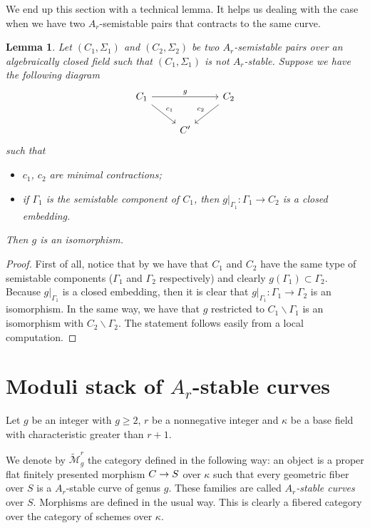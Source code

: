 \documentclass{alggeom}
\numberwithin{equation}{section}
\numberwithin{subsection}{section}
\newtheorem{lemma}[theorem]{Lemma}
\theoremstyle{definition}
\theoremstyle{remark}
\newcommand\arr{\ifinner\to\else\longrightarrow\fi}
\renewcommand{\setminus}{\smallsetminus}
\newcommand{\Mtilde}{\widetilde{\mathcal M}}
\begin{document}
We end up this section with a technical lemma. It helps us dealing with the case when we have two $A_r$-semistable pairs that contracts to the same curve.

\begin{lemma}\label{lem:contrac-unique}
 Let $(C_1,\Sigma_1)$ and $(C_2,\Sigma_2)$ be two $A_r$-semistable pairs over an algebraically closed field such that $(C_1,\Sigma_1)$ is not $A_r$-stable. Suppose we have the following diagram
 $$
 \begin{tikzcd}
C_1 \arrow[rd, "c_1"] \arrow[rr, "g"] &    & C_2 \arrow[ld, "c_2"'] \\
& C' &                       
\end{tikzcd}
$$
 such that 
 \begin{itemize}
  \item $c_1$, $c_2$ are minimal contractions;
  \item if $\Gamma_1$ is the semistable component of $C_1$, then $g\vert_{\Gamma_1}:\Gamma_1 \rightarrow C_2$ is a closed embedding.
 \end{itemize}
Then $g$ is an isomorphism. 
\end{lemma}

\begin{proof}
    First of all, notice that by  we have that $C_1$ and $C_2$ have the same type of semistable components ($\Gamma_1$ and $\Gamma_2$ respectively) and clearly $g(\Gamma_1)\subset\Gamma_2$. Because $g\vert_{\Gamma_1}$ is a closed embedding, then it is clear that $g\vert_{\Gamma_1}: \Gamma_1 \rightarrow \Gamma_2$ is an isomorphism. In the same way, we have that $g$ restricted to $C_1\setminus \Gamma_1$ is an isomorphism with $C_2\setminus \Gamma_2$.  The statement follows easily from a local computation.
\end{proof}


\section{Moduli stack of $A_r$-stable curves}\label{sec:2}
Let $g$ be an integer with $g\geq 2$, $r$ be a nonnegative integer and $\kappa$ be a base field with characteristic greater than $r+1$.

We denote by $\Mtilde_{g}^r$ the category defined in the following way: an object is a proper flat finitely presented morphism $C\arr S$ over $\kappa$ such that every geometric fiber over $S$ is a $A_r$-stable curve of genus $g$. These families are called \emph{$A_r$-stable curves} over $S$. Morphisms are defined in the usual way. This is clearly a fibered category over the category of schemes over $\kappa$. 
\end{document}
